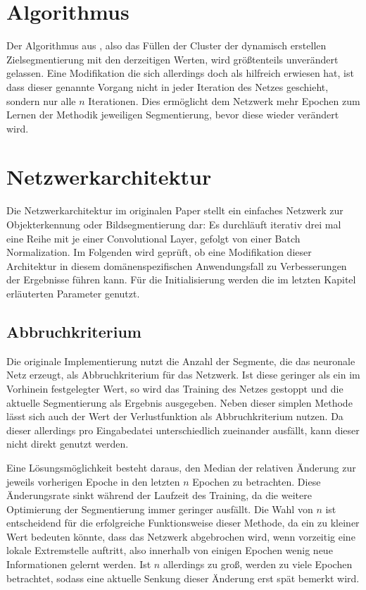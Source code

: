 \section{Algorithmus}
\label{sec:algorithm}

Der Algorithmus aus \cite{kanezaki_18}, also das Füllen der Cluster der dynamisch erstellen Zielsegmentierung mit den derzeitigen Werten, wird größtenteils unverändert gelassen. Eine Modifikation die sich allerdings doch als hilfreich erwiesen hat, ist dass dieser genannte Vorgang nicht in jeder Iteration des Netzes geschieht, sondern nur alle $n$ Iterationen. Dies ermöglicht dem Netzwerk mehr Epochen zum Lernen der Methodik jeweiligen Segmentierung, bevor diese wieder verändert wird.

\section{Netzwerkarchitektur}
\label{sec:network_architecture}

Die Netzwerkarchitektur im originalen Paper stellt ein einfaches Netzwerk zur Objekterkennung oder Bildsegmentierung dar: Es durchläuft iterativ drei mal eine Reihe mit je einer Convolutional Layer, gefolgt von einer Batch Normalization. Im Folgenden wird geprüft, ob eine Modifikation dieser Architektur in diesem domänenspezifischen Anwendungsfall zu Verbesserungen der Ergebnisse führen kann. Für die Initialisierung werden die im letzten Kapitel erläuterten Parameter genutzt.

\subsection{Abbruchkriterium}
\label{ssec:stoppingcriteria}

Die originale Implementierung nutzt die Anzahl der Segmente, die das neuronale Netz erzeugt, als Abbruchkriterium für das Netzwerk. Ist diese geringer als ein im Vorhinein festgelegter Wert, so wird das Training des Netzes gestoppt und die aktuelle Segmentierung als Ergebnis ausgegeben. Neben dieser simplen Methode lässt sich auch der Wert der Verlustfunktion als Abbruchkriterium nutzen. Da dieser allerdings pro Eingabedatei unterschiedlich zueinander ausfällt, kann dieser nicht direkt genutzt werden.

Eine Lösungsmöglichkeit besteht daraus, den Median der relativen Änderung zur jeweils vorherigen Epoche in den letzten $n$ Epochen zu betrachten. Diese Änderungsrate sinkt während der Laufzeit des Training, da die weitere Optimierung der Segmentierung immer geringer ausfällt. Die Wahl von $n$ ist entscheidend für die erfolgreiche Funktionsweise dieser Methode, da ein zu kleiner Wert bedeuten könnte, dass das Netzwerk abgebrochen wird, wenn vorzeitig eine lokale Extremstelle auftritt, also \zB innerhalb von einigen Epochen wenig neue Informationen gelernt werden. Ist $n$ allerdings zu groß, werden zu viele Epochen betrachtet, sodass eine aktuelle Senkung dieser Änderung erst spät bemerkt wird.

